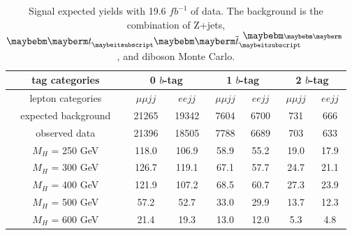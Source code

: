 \begin{table}[htb!]
\caption{ 
Signal expected yields with 19.6 $fb^{-1}$ of data. The background is the combination of Z+jets, $\Pqt \Paqt$, and diboson Monte Carlo.
}
\label{tab:yeilds_summery}
\vspace*{\medskipamount}
\begin{center}
\small
\begin{tabular}{|c|c|c|c|c|c|c|}
\hline
 tag categories &  \multicolumn{2}{c|}{0 $b$-tag}   &   \multicolumn{2}{c|}{1 $b$-tag}  &   \multicolumn{2}{c|}{2 $b$-tag}  \\ \hline
lepton categories &  $\mu \mu jj$ & $eejj$ &  $\mu \mu jj$ & $eejj$ &  $\mu \mu jj$ & $eejj$  \\ \hline \hline
expected background & 21265 & 19342 & 7604 & 6700 & 731 & 666 \\ \hline
observed data       & 21396 & 18505 & 7788 & 6689 & 703 & 633 \\ \hline \hline
$M_H$ =  250 GeV & 118.0 & 106.9 & 58.9 & 55.2 & 19.0 & 17.9 \\ \hline
$M_H$ =  300 GeV & 126.7 & 119.1 & 67.1 & 57.7 & 24.7 & 21.1 \\ \hline
$M_H$ =  400 GeV & 121.9 & 107.2 & 68.5 & 60.7 & 27.3 & 23.9 \\ \hline
$M_H$ =  500 GeV & 57.2  & 52.7 & 33.0 & 29.9 & 13.7 & 12.3 \\ \hline
$M_H$ =  600 GeV & 21.4  & 19.3 & 13.0 & 12.0 & 5.3 & 4.8 \\ \hline
\end{tabular}
\end{center}
\end{table}



